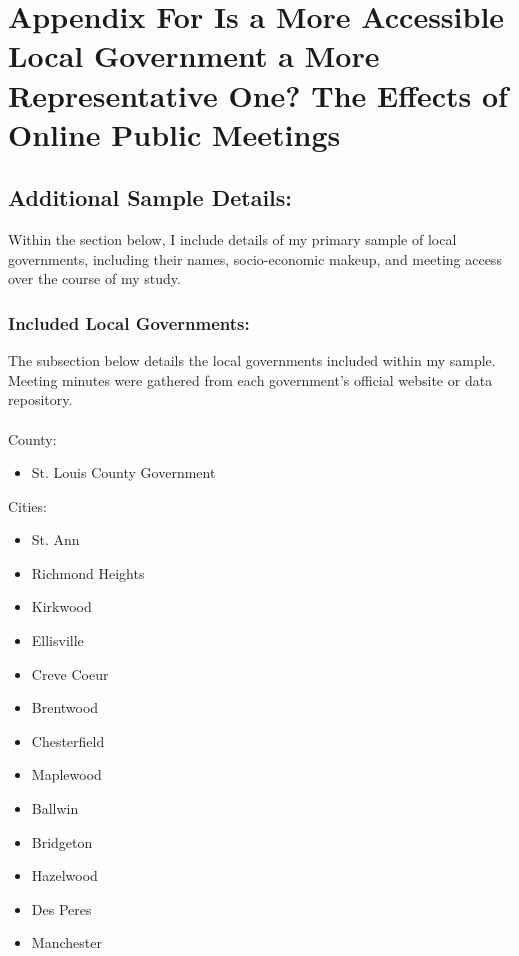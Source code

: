 \chapter{Appendix For Is a More Accessible Local Government a More Representative One? The Effects of Online Public Meetings}
\label{app:Chapter1}
\SingleSpacing*
{}

    \section{Additional Sample Details:}
    Within the section below, I include details of my primary sample of local governments, including their names, socio-economic makeup, and meeting access over the course of my study.
    
    \subsection{Included Local Governments:}
    The subsection below details the local governments included within my sample. Meeting minutes were gathered from each government's official website or data repository.\\\\
    County:
    \begin{itemize}
      \item St. Louis County Government
    \end{itemize}
    Cities:
    \begin{multicols}{2}
      \begin{itemize}
        \item St. Ann
        \item Richmond Heights
        \item Kirkwood
        \item Ellisville
        \item Creve Coeur
        \item Brentwood
        \item Chesterfield
        \item Maplewood
        \item Ballwin
        \item Bridgeton
        \item Hazelwood
        \item Des Peres
        \item Manchester
      \end{itemize}
    \end{multicols}
    
